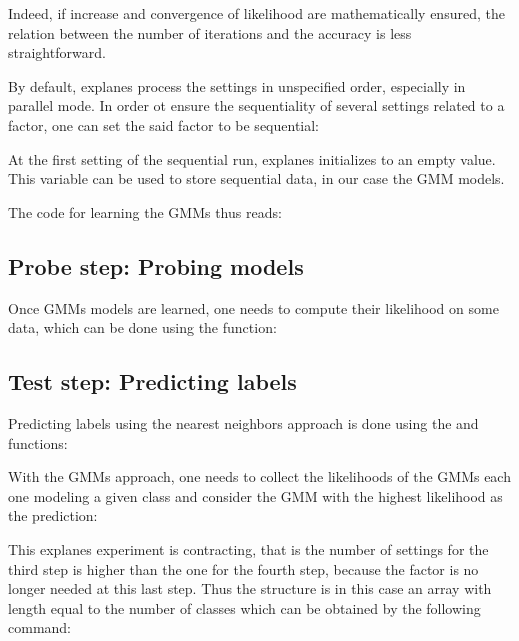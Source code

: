 \documentclass[12pt,a4paper,fleqn]{tufte-handout}
\begin{document}
Indeed, if increase and convergence of likelihood are mathematically ensured, the relation between the number of iterations and the accuracy is less straightforward. 

By default, explanes process the settings in unspecified order, especially in parallel mode. In order ot ensure the sequentiality of several settings related to a factor, one can set the said factor to be sequential:


At the first setting of the sequential run, explanes initializes  to an empty value. This variable can be used to store sequential data, in our case the GMM models.

The code for learning the GMMs thus reads:



\subsection{\textbf{Probe step}: Probing models}

Once GMMs models are learned, one needs to compute their likelihood on some data, which can be done using the  function:



\subsection{\textbf{Test step}: Predicting labels}

Predicting labels using the nearest neighbors approach is done using the  and  functions:



With the GMMs approach, one needs to collect the likelihoods of the GMMs each one modeling a given class and consider the GMM with the highest likelihood as the prediction:



This explanes experiment is contracting, that is the number of settings for the third step is higher than the one for the fourth step, because the factor  is no longer needed at this last step. Thus the  structure is in this case an array with length equal to the number of classes which can be obtained by the following command:
\end{document}
